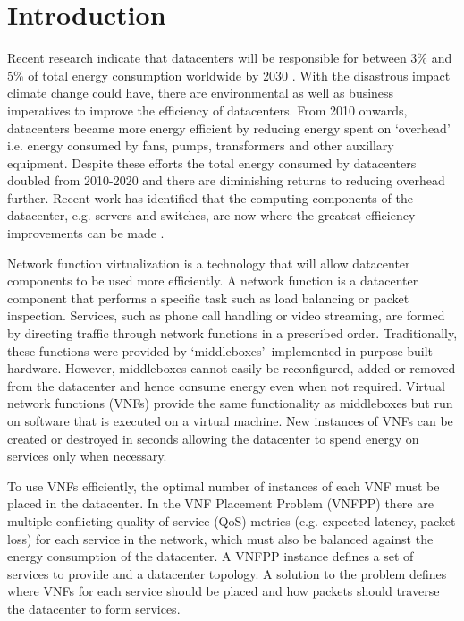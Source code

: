 \section{Introduction}
Recent research indicate that datacenters will be responsible for between 3\% and 5\% of total energy consumption worldwide by 2030 \cite{AndraeE15}. With the disastrous impact climate change could have, there are environmental as well as business imperatives to improve the efficiency of datacenters. From 2010 onwards, datacenters became more energy efficient by reducing energy spent on `overhead' \cite{AvgerinouBC17} i.e. energy consumed by fans, pumps, transformers and other auxillary equipment. Despite these efforts the total energy consumed by datacenters doubled from 2010-2020 \cite{DoddAGC20} and there are diminishing returns to reducing overhead further. Recent work has identified that the computing components of the datacenter, e.g. servers and switches, are now where the greatest efficiency improvements can be made \cite{DoddAGC20}.

Network function virtualization is a technology that will allow datacenter components to be used more efficiently. A network function is a datacenter component that performs a specific task such as load balancing or packet inspection. Services, such as phone call handling or video streaming, are formed by directing traffic through network functions in a prescribed order. Traditionally, these functions were provided by \lq middleboxes\rq\ implemented in purpose-built hardware. However, middleboxes cannot easily be reconfigured, added or removed from the datacenter and hence consume energy even when not required. Virtual network functions (VNFs) provide the same functionality as middleboxes but run on software that is executed on a virtual machine. New instances of VNFs can be created or destroyed in seconds \cite{AbritaSAA18} allowing the datacenter to spend energy on services only when necessary.

To use VNFs efficiently, the optimal number of instances of each VNF must be placed in the datacenter. In the VNF Placement Problem (VNFPP) there are multiple conflicting quality of service (QoS) metrics (e.g. expected latency, packet loss) for each service in the network, which must also be balanced against the energy consumption of the datacenter. A VNFPP instance defines a set of services to provide and a datacenter topology. A solution to the problem defines where VNFs for each service should be placed and how packets should traverse the datacenter to form services.

